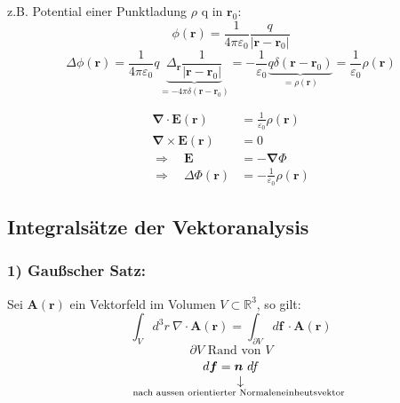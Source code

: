 \documentclass[titlepage,11pt,a4paper,ngerman]{report}
\newcommand{\tx}[1]{\textrm{#1}}
\newcommand{\custo}[3]{\underset{\scriptstyle\overset{\mkern4mu\rotatebox{-90}{$\,#1$}}{#3}}{#2}}
\renewcommand{\Phi}{\varPhi}
\newcommand{\kq}{\frac{1}{4\pi\epsilon_0}}
\renewcommand{\vec}[1]{\boldsymbol{#1}}
\renewcommand{\epsilon}{\varepsilon}
\renewcommand{\paragraph}[1]{\subsubsection{#1}}
\newcommand{\bbb}[2]{\begin{tcolorbox}[colback=white,colframe=black,fonttitle=\bfseries,title=#1,sharp corners,tcbox raise base]#2\end{tcolorbox}}
\begin{document}
z.B. Potential einer Punktladung $\rho$ q in $\vec{r}_0$:
$$\phi(\vec{r}) = \kq \frac{q}{|\vec{r} - \vec{r}_0|}$$
$$\Delta \phi(\vec{r}) = \kq q \underbrace{\Delta_{\vec{r}} \frac{1}{|\vec{r} - \vec{r}_0|} }_{= - 4 \pi \delta(\vec{r} - \vec{r}_0)} = - \frac{1}{\epsilon_0} \underbrace{q \delta(\vec{r} - \vec{r}_0)}_{= \rho(\vec{r})} = \frac{1}{\epsilon_0} \rho(\vec{r})$$


\bbb{Wiederholung}{\begin{align*}
	\vec{\nabla} \cdot \vec{E}(\vec{r}) &= \frac{1}{\epsilon_0} \rho(\vec{r})\\
	\vec{\nabla} \times \vec{E}(\vec{r}) &= 0 \\[10pt]
	\Rightarrow \quad \vec{E} &= - \vec{\nabla} \Phi \\
	\Rightarrow \quad \Delta \Phi (\vec{r}) &= - \frac{1}{\epsilon_0} \rho(\vec{r})
	\end{align*}
}

\subsection{Integralsätze der Vektoranalysis}

\paragraph{1) Gaußscher Satz:} 
Sei $\vec{A}(\vec{r})$ ein Vektorfeld im Volumen $V \subset \mathbb R^3$, so gilt:
$$\int_V d^3r\ \nabla \cdot \vec{A}(\vec{r}) = \int_{\partial V} d\vec{f}\ \cdot \vec{A}(\vec{r})$$
$$\partial V \tx{ Rand von } V$$
$$d \vec{f} = \custo{\rightarrow}{\vec{n}}{\mathclap{\textrm{nach aussen orientierter Normaleneinheutsvektor}}}\ df$$




\end{document}
